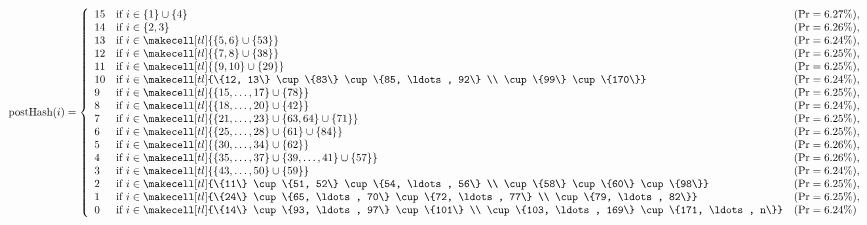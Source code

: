\renewcommand{\arraystretch}{1.25}{
\[
\text{postHash}(i) = \left\{
\begin{array}{lll}
    15 & \text{if } i \in \{1\} \cup \{4\} & (\text{Pr} = 6.27\%), \\
    14 & \text{if } i \in \{2, 3\} & (\text{Pr} = 6.26\%), \\
    13 & \text{if } i \in \makecell[tl]{\{5, 6\} \cup \{53\}} & (\text{Pr} = 6.24\%), \\
    12 & \text{if } i \in \makecell[tl]{\{7, 8\} \cup \{38\}} & (\text{Pr} = 6.25\%), \\
    11 & \text{if } i \in \makecell[tl]{\{9, 10\} \cup \{29\}} & (\text{Pr} = 6.25\%), \\
    10 & \text{if } i \in \makecell[tl]{\{12, 13\} \cup \{83\} \cup \{85, \ldots, 92\} \\ \cup \{99\} \cup \{170\}} & (\text{Pr} = 6.24\%), \\
    9  & \text{if } i \in \makecell[tl]{\{15, \ldots, 17\} \cup \{78\}} & (\text{Pr} = 6.25\%), \\
    8  & \text{if } i \in \makecell[tl]{\{18, \ldots, 20\} \cup \{42\}} & (\text{Pr} = 6.24\%), \\
    7  & \text{if } i \in \makecell[tl]{\{21, \ldots, 23\} \cup \{63, 64\} \cup \{71\}} & (\text{Pr} = 6.25\%), \\
    6  & \text{if } i \in \makecell[tl]{\{25, \ldots, 28\} \cup \{61\} \cup \{84\}} & (\text{Pr} = 6.25\%), \\
    5  & \text{if } i \in \makecell[tl]{\{30, \ldots, 34\} \cup \{62\}} & (\text{Pr} = 6.26\%), \\
    4  & \text{if } i \in \makecell[tl]{\{35, \ldots, 37\} \cup \{39, \ldots, 41\} \cup \{57\}} & (\text{Pr} = 6.26\%), \\
    3  & \text{if } i \in \makecell[tl]{\{43, \ldots, 50\} \cup \{59\}} & (\text{Pr} = 6.24\%), \\
    2  & \text{if } i \in \makecell[tl]{\{11\} \cup \{51, 52\} \cup \{54, \ldots, 56\} \\ \cup \{58\} \cup \{60\} \cup \{98\}} & (\text{Pr} = 6.25\%), \\
    1  & \text{if } i \in \makecell[tl]{\{24\} \cup \{65, \ldots, 70\} \cup \{72, \ldots, 77\} \\ \cup \{79, \ldots, 82\}} & (\text{Pr} = 6.25\%), \\
    0  & \text{if } i \in \makecell[tl]{\{14\} \cup \{93, \ldots, 97\} \cup \{101\} \\ \cup \{103, \ldots, 169\} \cup \{171, \ldots, n\}} & (\text{Pr} = 6.24\%)
\end{array}
\right.
\]
}
